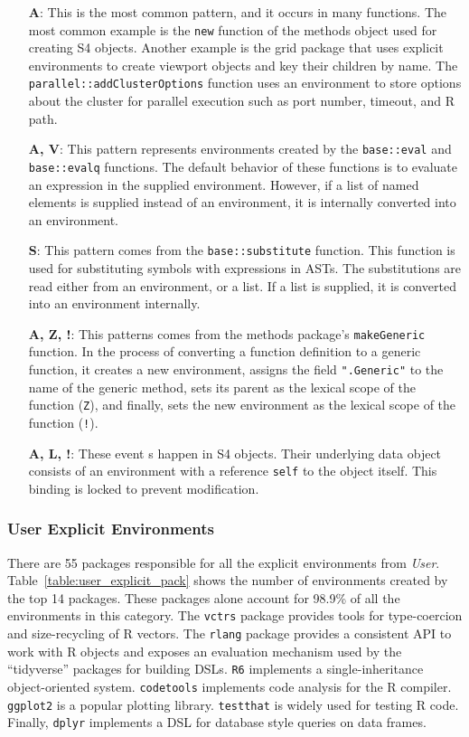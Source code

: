 \documentclass[10pt,review,sigplan,anonymous=true,authorversion=true,nonacm=true]{acmart}
\newcommand{\code}[1]{\lstinline |#1|\xspace}
\begin{document}
\begin{itemize}
\item[\textbf{A}:] This is the most common pattern, and it occurs in many
  functions. The most common example is the \code{new} function of the methods
  object used for creating S4 objects. Another example is the grid package that
  uses explicit environments to create viewport objects and key their children
  by name. The \code{parallel::addClusterOptions} function uses an environment
  to store options about the cluster for parallel execution such as port number,
  timeout, and R path.
\item[\textbf{A, V}:] This pattern represents environments created by the
  \code{base::eval} and \code{base::evalq} functions. The default behavior of
  these functions is to evaluate an expression in the supplied environment.
  However, if a list of named elements is supplied instead of an environment, it
  is internally converted into an environment.
\item[\textbf{S}:] This pattern comes from the \code{base::substitute} function.
  This function is used for substituting symbols with expressions in ASTs. The
  substitutions are read either from an environment, or a list. If a list is
  supplied, it is converted into an environment internally.
\item[\textbf{A, Z, !}:] This patterns comes from the methods package's
  \code{makeGeneric} function. In the process of converting a function
  definition to a generic function, it creates a new environment, assigns the
  field \code{".Generic"} to the name of the generic method, sets its parent as
  the lexical scope of the function (\texttt{Z}), and finally, sets the new
  environment as the lexical scope of the function (\texttt{!}).
\item[\textbf{A, L, !}:] These event s happen in S4 objects. Their underlying
  data object consists of an environment with a reference \code{self} to the
  object itself. This binding is locked to prevent modification.
\end{itemize}



\subsubsection{User Explicit Environments}
There are 55 packages responsible for all the explicit environments from
\emph{User}. Table~\ref{table:user_explicit_pack} shows the number of
environments created by the top 14 packages. These packages alone account for
98.9\% of all the environments in this category. The \code{vctrs} package
provides tools for type-coercion and size-recycling of R vectors. The
\code{rlang} package provides a consistent API to work with R objects and
exposes an evaluation mechanism used by the ``tidyverse'' packages for building
DSLs. \code{R6} implements a single-inheritance object-oriented system.
\code{codetools} implements code analysis for the R compiler. \code{ggplot2} is
a popular plotting library. \code{testthat} is widely used for testing R code.
Finally, \code{dplyr} implements a DSL for database style queries on data
frames.
\end{document}
